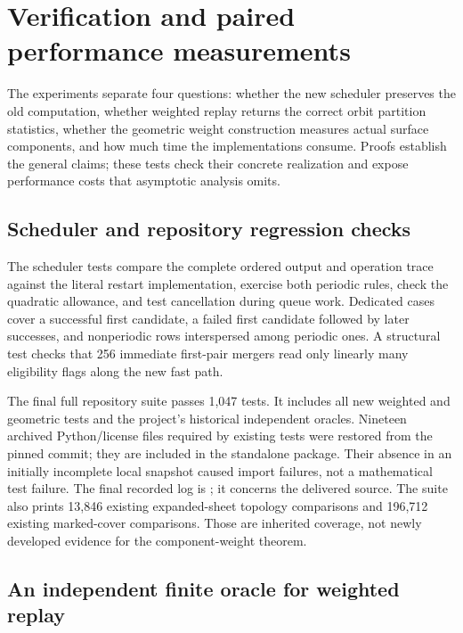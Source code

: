 \section{Verification and paired performance measurements}
\label{sec:experiments}

The experiments separate four questions: whether the new scheduler preserves
the old computation, whether weighted replay returns the correct orbit
partition statistics, whether the geometric weight construction measures
actual surface components, and how much time the implementations consume.
Proofs establish the general claims; these tests check their concrete
realization and expose performance costs that asymptotic analysis omits.

\subsection{Scheduler and repository regression checks}

The scheduler tests compare the complete ordered output and operation trace
against the literal restart implementation, exercise both periodic rules,
check the quadratic allowance, and test cancellation during queue work.
Dedicated cases cover a successful first candidate, a failed first candidate
followed by later successes, and nonperiodic rows interspersed among periodic
ones.  A structural test checks that 256 immediate first-pair mergers read
only linearly many eligibility flags along the new fast path.

The final full repository suite passes 1,047 tests.  It includes all new
weighted and geometric tests and the project's historical independent
oracles.  Nineteen archived Python/license files required by existing tests
were restored from the pinned commit; they are included in the standalone
package.  Their absence in an initially incomplete local snapshot caused
import failures, not a mathematical test failure.  The final recorded log is
; it concerns the delivered source.
The suite also prints 13,846 existing expanded-sheet topology comparisons
and 196,712 existing marked-cover comparisons.  Those are inherited coverage,
not newly developed evidence for the component-weight theorem.

\subsection{An independent finite oracle for weighted replay}


